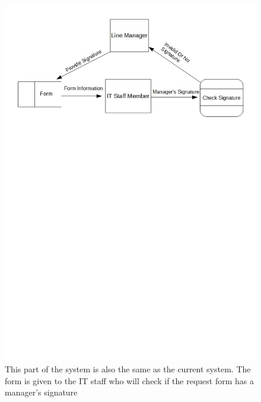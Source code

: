 \begin{figure}[H]
\includegraphics[width=\textwidth]{dataflowdiagram2.jpg}
\caption{This part of the system is also the same as the current system. The form is given to the IT staff who will check if the request form has a manager's signature } \label{Page1Interview}
\end{figure}


